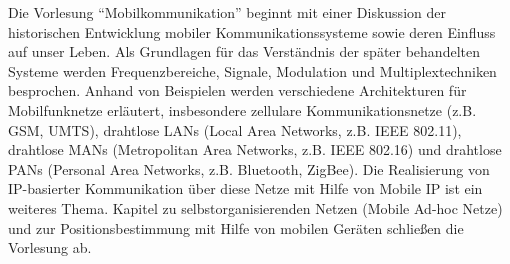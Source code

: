 \begin{module}
\begin{learningoutcomes}
\end{learningoutcomes}

\begin{content}
Die Vorlesung “Mobilkommunikation” beginnt mit einer Diskussion der historischen Entwicklung mobiler Kommunikationssysteme sowie deren Einfluss auf unser Leben. Als Grundlagen für das Verständnis der später behandelten Systeme werden Frequenzbereiche, Signale, Modulation und Multiplextechniken besprochen. Anhand von Beispielen werden verschiedene Architekturen für Mobilfunknetze erläutert, insbesondere zellulare Kommunikationsnetze (z.B. GSM, UMTS), drahtlose LANs (Local Area Networks, z.B. IEEE 802.11), drahtlose MANs (Metropolitan Area Networks, z.B. IEEE 802.16) und drahtlose PANs (Personal Area Networks, z.B. Bluetooth, ZigBee). Die Realisierung von IP-basierter Kommunikation über diese Netze mit Hilfe von Mobile IP ist ein weiteres Thema. Kapitel zu selbstorganisierenden Netzen (Mobile Ad-hoc Netze) und zur Positionsbestimmung mit Hilfe von mobilen Geräten schließen die Vorlesung ab.


\end{content}



\end{module}

